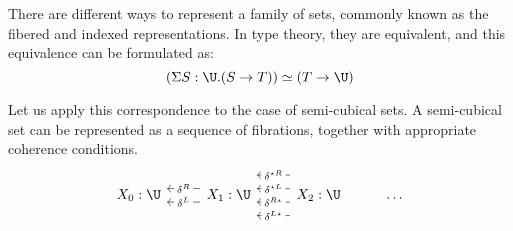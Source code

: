 \documentclass{msc}
\newcommand{\kstar}{{\star}}
\begin{document}

There are different ways to represent a family of sets, commonly known as the fibered and indexed representations. In type theory, they are equivalent, and this equivalence can be formulated as:
\begin{equation*}
  (\Sigma S: \U. (S \rightarrow T)) \simeq (T \rightarrow \U)
\end{equation*}

Let us apply this correspondence to the case of semi-cubical sets. A semi-cubical set can be represented as a sequence of fibrations, together with appropriate coherence conditions.
\begin{equation*}
  \begin{tikzcd}
    X_0: \U & X_1: \U \arrow[l, "\delta^L" description, shift left=2] \arrow[l, "\delta^R" description, shift right=2] & X_2: \U \arrow[l, "\delta^{L\kstar}" description, shift left=6] \arrow[l, "\delta^{R\kstar}" description, shift left=2] \arrow[l, "\delta^{\kstar L}" description, shift right=2] \arrow[l, "\delta^{\kstar R}" description, shift right=6] & \ldots
  \end{tikzcd}
\end{equation*}
\end{document}
